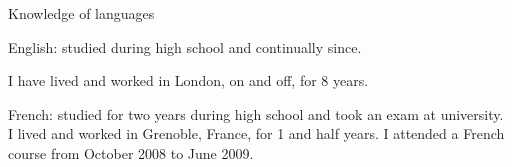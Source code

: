 \begin{rubric}{Knowledge of languages}

\entry*[16 years]
English: studied during high school and continually since.


I have lived and worked in London, on and off, for 8 years.

\entry*[3 years]
French: studied for two years during high school and took an exam
at university.
I lived and worked in Grenoble, France, for 1 and half years.
I attended a French course from October 2008 to June 2009.




\end{rubric}
